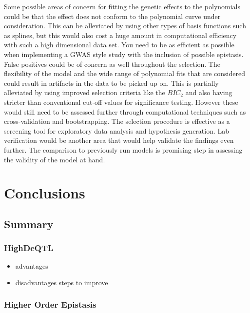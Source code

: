 \documentclass[11pt,]{book}
\providecommand{\tightlist}{%
  \setlength{\itemsep}{0pt}\setlength{\parskip}{0pt}}
\theoremstyle{definition}
\theoremstyle{definition}
\theoremstyle{remark}
\begin{document}
Some possible areas of concern for fitting the genetic effects to the
polynomials could be that the effect does not conform to the polynomial
curve under consideration. This can be alleviated by using other types
of basis functions such as splines, but this would also cost a huge
amount in computational efficiency with such a high dimensional data
set. You need to be as efficient as possible when implementing a GWAS
style study with the inclusion of possible epistasis. False positives
could be of concern as well throughout the selection. The flexibility of
the model and the wide range of polynomial fits that are considered
could result in artifacts in the data to be picked up on. This is
partially alleviated by using improved selection criteria like the
\(BIC_2\) and also having stricter than conventional cut-off values for
significance testing. However these would still need to be assessed
further through computational techniques such as cross-validation and
bootstrapping. The selection procedure is effective as a screening tool
for exploratory data analysis and hypothesis generation. Lab
verification would be another area that would help validate the findings
even further. The comparison to previously run models is promising step
in assessing the validity of the model at hand.

\chapter{Conclusions}\label{conclusions}

\section{Summary}\label{summary}

\subsection{HighDeQTL}\label{highdeqtl-1}

\begin{itemize}
\tightlist
\item
  advantages
\item
  disadvantages steps to improve
\end{itemize}

\subsection{Higher Order Epistasis}\label{higher-order-epistasis-1}
\end{document}
